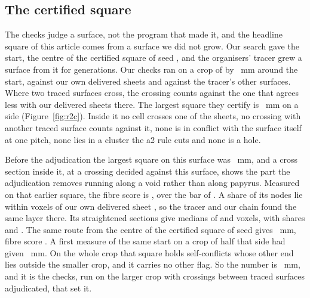 \subsection{The certified square}

The checks judge a surface, not the program that made it, and the headline square of this article comes from a surface
we did not grow. Our search gave the start, the centre of the certified square of seed \RcOneSeedId{}, and the
organisers' tracer grew a surface from it for \RcOneGenerations{} generations. Our checks ran on a crop of \RcCrop{} by
\RcCrop{}~mm around the start, against our own delivered sheets and against the tracer's other surfaces. Where two
traced surfaces cross, the crossing counts against the one that agrees less with our delivered sheets there. The largest
square they certify is \RcOneSquare{}~mm on a side (Figure~\ref{fig:r2c}). Inside it no cell crosses one of the \UnionSheets{} sheets,
no crossing with another traced surface counts against it, none is in conflict with the surface itself at one pitch,
none lies in a cluster the a2 rule cuts and none is a hole.

Before the adjudication the largest square on this surface was \RcOneSquareBefore{}~mm, and a cross section inside it, at
a crossing decided against this surface, shows the part the adjudication removes running along a void rather than
along papyrus. Measured on that earlier square, the fibre score is \RcOneFibre{}, over the bar of \FibreBar{}. A
share \RcOneOnOurs{} of its nodes lie within \StraightNear{} voxels of our own delivered sheet \RcOneOurSheet{}, so the
tracer and our chain found the same layer there. Its straightened sections give medians of \RcOneSecIMedian{} and
\RcOneSecJMedian{} voxels, with shares \RcOneSecIShare{} and \RcOneSecJShare{}. The same route from the centre of the
certified square of seed \RcTwoSeedId{} gives \RcTwoSquare{}~mm, fibre score \RcTwoFibre{}. A first measure of the same
start on a crop of half that side had given \RcOldSquare{}~mm. On the whole crop that square holds self-conflicts whose
other end lies outside the smaller crop, and it carries no other flag. So the number is \RcOneSquare{}~mm, and it is the
checks, run on the larger crop with crossings between traced surfaces adjudicated, that set it.

